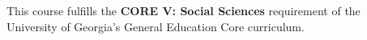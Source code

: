 This course fulfills the \textbf{CORE V: Social Sciences} requirement of the University of Georgia's General Education Core curriculum.
